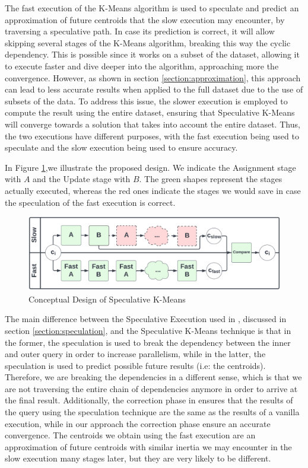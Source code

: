 The fast execution of the K-Means algorithm is used to speculate and predict an approximation of future centroids that the slow execution may encounter, by traversing a speculative path. In case its prediction is correct, it will allow skipping several stages of the K-Means algorithm, breaking this way the cyclic dependency. This is possible since it works on a subset of the dataset, allowing it to execute faster and dive deeper into the algorithm, approaching more the convergence. However, as shown in section \ref{section:approximation}, this approach can lead to less accurate results when applied to the full dataset due to the use of subsets of the data.
To address this issue, the slower execution is employed to compute the result using the entire dataset, ensuring that Speculative K-Means will converge towards a solution that takes into account the entire dataset. Thus, the two executions have different purposes, with the fast execution being used to speculate and the slow execution being used to ensure accuracy.

In Figure \ref{fig:speculation_conceptual_design},we illustrate the proposed design. We indicate the Assignment stage with $A$ and the Update stage with $B$. The green shapes represent the stages actually executed, whereas the red ones indicate the stages we would save in case the speculation of the fast execution is correct. 

\begin{figure}[ht]
\centering
\includegraphics[width=\linewidth]{./plots/speculative_KMeans_conceptual_design.png}
\caption{Conceptual Design of Speculative K-Means}
\label{fig:speculation_conceptual_design}
\end{figure}


The main difference between the Speculative Execution used in \cite{Sioulas:282304}, discussed in section \ref{section:speculation}, and the Speculative K-Means technique is that in the former, the speculation is used to break the dependency between the inner and outer query in order to increase parallelism, while in the latter, the speculation is used to predict possible future results (i.e: the centroids). Therefore, we are breaking the dependencies in a different sense, which is that we are not traversing the entire chain of dependencies anymore in order to arrive at the final result. Additionally, the correction phase in \cite{Sioulas:282304} ensures that the results of the query using the speculation technique are the same as the results of a vanilla execution, while in our approach the correction phase ensure an accurate convergence. The centroids we obtain using the fast execution are an approximation of future centroids with similar inertia we may encounter in the slow execution many stages later, but they are very likely to be different.

